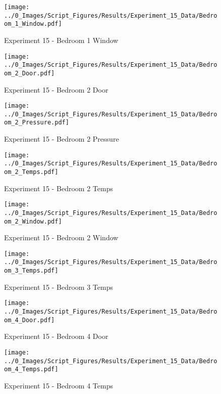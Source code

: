 	\clearpage

	\begin{figure}[H]
		\centering
		\texttt{[image: ../0\_Images/Script\_Figures/Results/Experiment\_15\_Data/Bedroom\_1\_Window.pdf]}
		\caption[]{Experiment 15 - Bedroom 1 Window}
	\end{figure}
 

	\begin{figure}[H]
		\centering
		\texttt{[image: ../0\_Images/Script\_Figures/Results/Experiment\_15\_Data/Bedroom\_2\_Door.pdf]}
		\caption[]{Experiment 15 - Bedroom 2 Door}
	\end{figure}
 
	\clearpage

	\begin{figure}[H]
		\centering
		\texttt{[image: ../0\_Images/Script\_Figures/Results/Experiment\_15\_Data/Bedroom\_2\_Pressure.pdf]}
		\caption[]{Experiment 15 - Bedroom 2 Pressure}
	\end{figure}
 

	\begin{figure}[H]
		\centering
		\texttt{[image: ../0\_Images/Script\_Figures/Results/Experiment\_15\_Data/Bedroom\_2\_Temps.pdf]}
		\caption[]{Experiment 15 - Bedroom 2 Temps}
	\end{figure}
 
	\clearpage

	\begin{figure}[H]
		\centering
		\texttt{[image: ../0\_Images/Script\_Figures/Results/Experiment\_15\_Data/Bedroom\_2\_Window.pdf]}
		\caption[]{Experiment 15 - Bedroom 2 Window}
	\end{figure}
 

	\begin{figure}[H]
		\centering
		\texttt{[image: ../0\_Images/Script\_Figures/Results/Experiment\_15\_Data/Bedroom\_3\_Temps.pdf]}
		\caption[]{Experiment 15 - Bedroom 3 Temps}
	\end{figure}
 
	\clearpage

	\begin{figure}[H]
		\centering
		\texttt{[image: ../0\_Images/Script\_Figures/Results/Experiment\_15\_Data/Bedroom\_4\_Door.pdf]}
		\caption[]{Experiment 15 - Bedroom 4 Door}
	\end{figure}
 

	\begin{figure}[H]
		\centering
		\texttt{[image: ../0\_Images/Script\_Figures/Results/Experiment\_15\_Data/Bedroom\_4\_Temps.pdf]}
		\caption[]{Experiment 15 - Bedroom 4 Temps}
	\end{figure}
 
